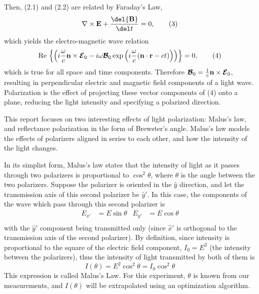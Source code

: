\documentclass[11pt]{article}
\begin{document}
\begin{multicols}{2}
    Then, (2.1) and (2.2) are related by Faraday's Law, 
    \[\nabla\times{\bf{E}} + \frac{\del {\bf{B}}}{\del t} = 0, \tag{3}\]
    \nd which yields the electro-magnetic wave relation
    \[
        \text{Re}\,\left\{\left(i\frac{\omega}{c}{\bf{n}}\times{\boldsymbol{\mathcal{E}}_0} - i\omega{\boldsymbol{\mathcal{B}}_0}\exp\left(i\frac{\omega}{c}({\bf{n}}\cdot {\bf{r}} - ct)\right)\right)\right\} = 0,   \tag{4}
    \]
    \nd which is true for all space and time components. Therefore $\boldsymbol{\mathcal{B}}_0 = \frac{1}{c}{\bf{n}}\times \boldsymbol{\mathcal{E}}_0$, resulting in perpendicular electric and magnetic field components of a light wave. Polarization is the effect of projecting these vector components of (4) onto a plane, reducing the light intensity and specifying a polarized direction.
    
    This report focuses on two interesting effects of light polarization: Malus's law, and reflectance polarization in the form of Brewster's angle.
    \nd Malus's law models the effects of polarizers aligned in series to each other, and how the intensity of the light changes. 
    
    
    In its simplist form, Malus's law states that the intensity of light as it passes through two polarizers is proportional to $\cos^2\theta$, where $\theta$ is the angle between the two polarizers. Suppose the polarizer is oriented in the $\hat{y}$ direction, and let the transmission axis of this second polarizer be $\hat{y}'$. In this case, the components of the wave which pass through this second polarizer is
    \begin{align*}
        E_{x'} &= E \sin \theta & E_{y'} &= E \cos \theta \tag{5}\\ 
    \end{align*}
    with the $\hat{y}'$ component being transmitted only (since $\hat{x}'$ is orthogonal to the transmission axis of the second polarizer). By definition, since intensity is proportional to the square of the electric field component, $I_0 = E^2$ (the intensity between the polarizers), thus the intensity of light transmitted by both of them is
    \begin{equation*}
        I(\theta) = E^2 \cos^2\theta = I_0 \cos^2\theta  \tag{6}
    \end{equation*}
    This expression is called Malus's Law. For this experiment, $\theta$ is known from our measurements, and $I(\theta)$ will be extrapolated using an optimization algorithm.


\end{multicols}
\end{document}
